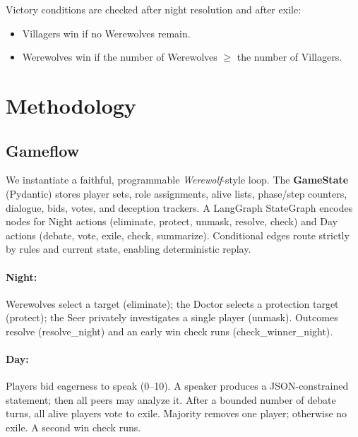 \documentclass{article}
\begin{document}
Victory conditions are checked after night resolution and after exile:
\begin{itemize}
  \item Villagers win if no Werewolves remain.
  \item Werewolves win if the number of Werewolves \( \geq \) the number of Villagers.
\end{itemize}

\section{Methodology}

\subsection{Gameflow}
We instantiate a faithful, programmable \textit{Werewolf}-style loop. The \textbf{GameState} (Pydantic) stores player sets, role assignments, alive lists, phase/step counters, dialogue, bids, votes, and deception trackers. A LangGraph StateGraph encodes nodes for Night actions (eliminate, protect, unmask, resolve, check) and Day actions (debate, vote, exile, check, summarize). Conditional edges route strictly by rules and current state, enabling deterministic replay.

\paragraph{Night:} Werewolves select a target (eliminate); the Doctor selects a protection target (protect); the Seer privately investigates a single player (unmask). Outcomes resolve (resolve\_night) and an early win check runs (check\_winner\_night).

\paragraph{Day:} Players bid eagerness to speak (0–10). A speaker produces a JSON-constrained statement; then all peers may analyze it. After a bounded number of debate turns, all alive players vote to exile. Majority removes one player; otherwise no exile. A second win check runs.
\end{document}
